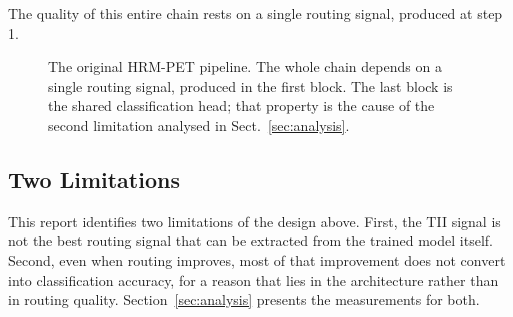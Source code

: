 \documentclass[11pt,a4paper]{article}
\begin{document}
The quality of this entire chain rests on a single routing signal, produced at
step 1.

\begin{figure}[H]
\centering
{}
\caption{The original HRM-PET pipeline. The whole chain depends on a single
routing signal, produced in the first block. The last block is the shared
classification head; that property is the cause of the second limitation
analysed in Sect.~\ref{sec:analysis}.}
\label{fig:hrmpet}
\end{figure}

\subsection{Two Limitations}

This report identifies two limitations of the design above. First, the TII
signal is not the best routing signal that can be extracted from the trained
model itself. Second, even when routing improves, most of that improvement does
not convert into classification accuracy, for a reason that lies in the
architecture rather than in routing quality. Section~\ref{sec:analysis} presents
the measurements for both.
\end{document}
